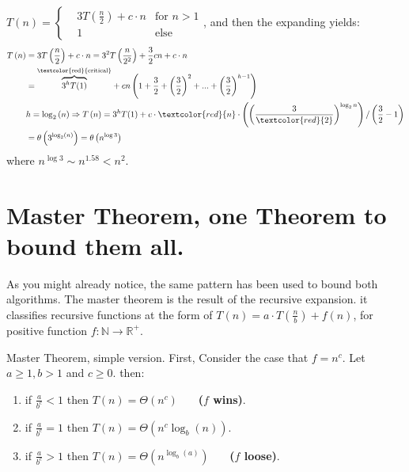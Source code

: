     \begin{example}\( T\left(n\right)  = \left\{ \begin{array}{rcl}
& 3T\left(\frac{n}{2}\right) + c\cdot n & \mbox{for }  n > 1  \\
& 1 & \mbox{else}  
\end{array}\right. \), and then the expanding yields: 
\begin{equation*}
    \begin{split}
        T\left(n\right) & = 3T\left(\frac{n}{2}\right) + c\cdot n = 3^2 T\left(\frac{n}{2^2}\right) + \frac{3}{2}cn + c\cdot n \\ 
        & =  \overset{\text{\textcolor{red}{critical}}}{\overbrace{3^{h}T(1)}} + cn\left(1 + \frac{3}{2} + \left(\frac{3}{2}\right)^2 + ...  + \left(\frac{3}{2}\right)^{h-1} \right) \\
        & h = \log_{2}\left(n\right) \Rightarrow T\left(n\right) = 3^{h}T(1) + c\cdot \textcolor{red}{n}\cdot \left(\left(\frac{3}{\textcolor{red}{2}}\right)^{\log_{2}{n}}\right) / \left(\frac{3}{2} - 1\right) \\ 
        & = \theta \left( 3^{\log_{2}(n)} \right) =  \theta \left( n^{\log 3} \right)  
    \end{split}
\end{equation*}
where \(n^{\log 3}  \sim n^{1.58} < n^2 \).
\end{example}


\section{Master Theorem, one Theorem to bound them all. }
As you might already notice, the same pattern has been used to bound both algorithms. The master theorem is the result of the recursive expansion. it classifies recursive functions at the form of \(T\left(n\right) = a\cdot T\left( \frac{n}{b} \right) + f\left(n\right) \), for positive function \(f : \mathbb{N} \rightarrow \mathbb{R}^{+} \).       

\begin{defbox}{Master Theorem, simple version.} First, Consider the case that \(f = n^c\). Let \( a \ge 1, b > 1\) and \( c \ge 0 \). then: 
\begin{enumerate}
    \item if \(\frac{a}{b^c} < 1 \) then \( T\left(n\right) = \Theta \left( n^c \right) \) \ \ \ \textbf{(\(f\) wins)}.
    \item if \(\frac{a}{b^c} = 1 \) then \( T\left(n\right) = \Theta \left( n^c \log_{b} \left(n\right) \right) \).
    \item if \(\frac{a}{b^c} > 1 \) then \( T\left(n\right) = \Theta \left( n^{\log_{b} \left(a\right)} \right) \) \ \ \ \textbf{(\(f\) loose)}.
  \end{enumerate}
\end{defbox}

